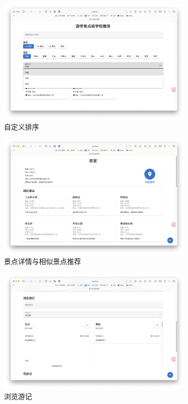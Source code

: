 \documentclass{ctexart}
\begin{document}
\begin{figure}[htbp]
    \centering
    \includegraphics[width=0.85\textwidth]{figure/sortby.png}
    \caption{自定义排序}
\end{figure}

\begin{figure}[htbp]
    \centering
    \includegraphics[width=0.85\textwidth]{figure/des.png}
    \caption{景点详情与相似景点推荐}
\end{figure}

\begin{figure}[htbp]
    \centering
    \includegraphics[width=0.85\textwidth]{figure/read.png}
    \caption{浏览游记}
\end{figure}
\end{document}
